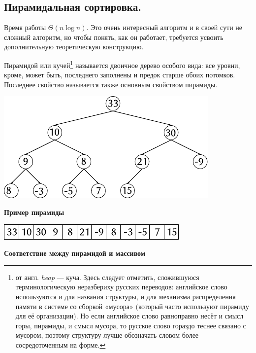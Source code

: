 \documentclass[12pt]{article}
\begin{document}
\subsection{Пирамидальная сортировка.} Время работы $ \Theta(n\log{n})$. Это очень интересный алгоритм и в своей сути не сложный алгоритм, но чтобы понять, как он работает, требуется усвоить дополнительную теоретическую конструкцию.

Пирамидой или кучей\footnote{от англ. \textit{heap} — куча. Здесь следует отметить, сложившуюся терминологическую неразбериху русских переводов: английское слово используются и для названия структуры, и для механизма распределения памяти в системе со сборкой «мусора» (который часто используют пирамиду для её организации). Но если английское слово равноправно несёт и смысл горы, пирамиды, и смысл мусора, то русское слово гораздо теснее связано с мусором, поэтому структуру лучше обозначать словом более сосредоточенным на форме.} называется двоичное дерево особого вида: все уровни, кроме, может быть, последнего заполнены и предок старше обоих потомков. Последнее свойство называется также основным свойством пирамиды.

\begin{center}
\includegraphics{fig1.pdf}

\textbf{Пример пирамиды}
\end{center}
\begin{center}
\includegraphics{fig2.pdf}

\textbf{Соответствие между пирамидой и массивом}
\end{center}
\end{document}
